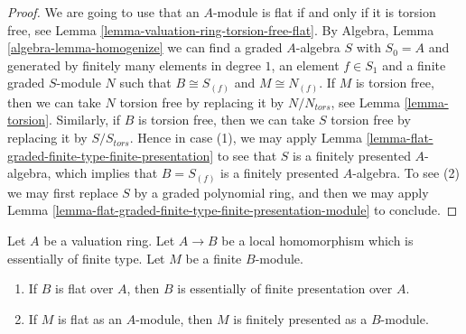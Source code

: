 \begin{proof}
We are going to use that an $A$-module is flat if and only if it is
torsion free, see
Lemma \ref{lemma-valuation-ring-torsion-free-flat}.
By
Algebra, Lemma \ref{algebra-lemma-homogenize}
we can find a graded $A$-algebra $S$ with $S_0 = A$ and generated
by finitely many elements in degree $1$, an element $f \in S_1$ and a
finite graded $S$-module $N$ such that $B \cong S_{(f)}$ and
$M \cong N_{(f)}$. If $M$ is torsion free, then we can take $N$ torsion
free by replacing it by $N/N_{tors}$, see
Lemma \ref{lemma-torsion}.
Similarly, if $B$ is torsion free, then we can take
$S$ torsion free by replacing it by $S/S_{tors}$.
Hence in case (1), we may apply
Lemma \ref{lemma-flat-graded-finite-type-finite-presentation}
to see that $S$ is a finitely presented
$A$-algebra, which implies that $B = S_{(f)}$ is a finitely
presented $A$-algebra. To see (2) we may first replace $S$ by
a graded polynomial ring, and then we may apply
Lemma \ref{lemma-flat-graded-finite-type-finite-presentation-module}
to conclude.
\end{proof}

\begin{lemma}
\label{lemma-valuation-ring-flat-essentially-finite-type}
Let $A$ be a valuation ring. Let $A \to B$ be a local homomorphism
which is essentially of finite type. Let $M$ be a finite $B$-module.
\begin{enumerate}
\item If $B$ is flat over $A$, then $B$ is essentially of finite
presentation over $A$.
\item If $M$ is flat as an $A$-module, then $M$ is finitely presented
as a $B$-module.
\end{enumerate}
\end{lemma}

